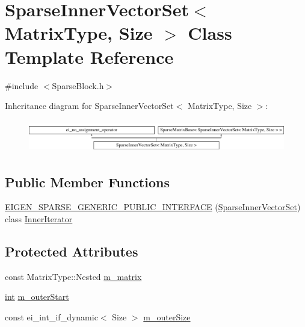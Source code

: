 \hypertarget{class_sparse_inner_vector_set}{\section{Sparse\-Inner\-Vector\-Set$<$ Matrix\-Type, Size $>$ Class Template Reference}
\label{class_sparse_inner_vector_set}
}


{\ttfamily \#include $<$Sparse\-Block.\-h$>$}

Inheritance diagram for Sparse\-Inner\-Vector\-Set$<$ Matrix\-Type, Size $>$\-:\begin{figure}[H]
\begin{center}
\leavevmode
\includegraphics[height=1.428571cm]{class_sparse_inner_vector_set}
\end{center}
\end{figure}
\subsection*{Public Member Functions}
\begin{DoxyCompactItemize}
\item 
\hyperlink{class_sparse_inner_vector_set_a14026a505b84208fff695b7a11318edb}{E\-I\-G\-E\-N\-\_\-\-S\-P\-A\-R\-S\-E\-\_\-\-G\-E\-N\-E\-R\-I\-C\-\_\-\-P\-U\-B\-L\-I\-C\-\_\-\-I\-N\-T\-E\-R\-F\-A\-C\-E} (\hyperlink{class_sparse_inner_vector_set}{Sparse\-Inner\-Vector\-Set}) class \hyperlink{class_inner_iterator}{Inner\-Iterator}
\end{DoxyCompactItemize}
\subsection*{Protected Attributes}
\begin{DoxyCompactItemize}
\item 
const Matrix\-Type\-::\-Nested \hyperlink{class_sparse_inner_vector_set_a61dedf0e5e5c09454c45a992b0a18a68}{m\-\_\-matrix}
\item 
\hyperlink{ioapi_8h_a787fa3cf048117ba7123753c1e74fcd6}{int} \hyperlink{class_sparse_inner_vector_set_aa1d89006cff9017865c21023cd6f8ca9}{m\-\_\-outer\-Start}
\item 
const ei\-\_\-int\-\_\-if\-\_\-dynamic$<$ Size $>$ \hyperlink{class_sparse_inner_vector_set_acbf835dcedf2ddc684ae72c352a34f7e}{m\-\_\-outer\-Size}
\end{DoxyCompactItemize}
